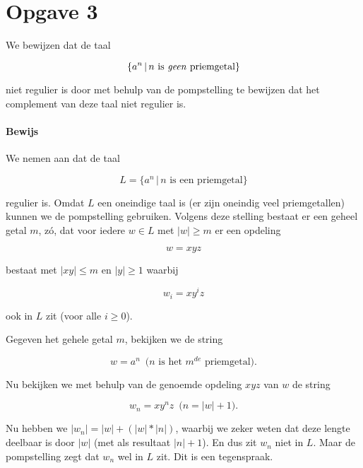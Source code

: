 \documentclass[a4paper,11pt]{article}
\begin{document}
\section*{Opgave 3}


We bewijzen dat de taal

\begin{displaymath}
\{a^{n} \, | \, n \mbox{ is \emph{geen} priemgetal}\}
\end{displaymath}

niet regulier is door met behulp van de pompstelling te bewijzen dat het
complement van deze taal niet regulier is.

\paragraph{Bewijs}

We nemen aan dat de taal

\begin{displaymath}
L = \{a^{n} \, | \, n \mbox{ is een priemgetal}\}
\end{displaymath}

regulier is. Omdat $L$ een oneindige taal is (er zijn oneindig veel
priemgetallen) kunnen we de pompstelling gebruiken. Volgens deze stelling
bestaat er een geheel getal $m$, z\'o, dat voor iedere $w \in L$ met
$|w| \geq m$ er een opdeling

\begin{displaymath}
w = xyz
\end{displaymath}

bestaat met $|xy| \leq m$ en $|y| \geq 1$ waarbij

\begin{displaymath}
w_{i} = xy^{i}z
\end{displaymath}

ook in $L$ zit (voor alle $i \geq 0$).

Gegeven het gehele getal $m$, bekijken we de string

\begin{displaymath}
w = a^{n} \, \mbox{ ($n$ is het $m^{de}$ priemgetal).}
\end{displaymath}

Nu bekijken we met behulp van de genoemde opdeling $xyz$ van $w$ de string

\begin{displaymath}
w_{n} = xy^{n}z \, \mbox{ ($n = |w|+1$).}
\end{displaymath}

Nu hebben we $|w_{n}| = |w|+(|w|*|n|)$, waarbij we zeker weten dat deze
lengte deelbaar is door $|w|$ (met als resultaat $|n|+1$). En dus zit $w_{n}$
niet in $L$. Maar de pompstelling zegt dat $w_{n}$ wel in $L$ zit. Dit is
een tegenspraak.
\end{document}
